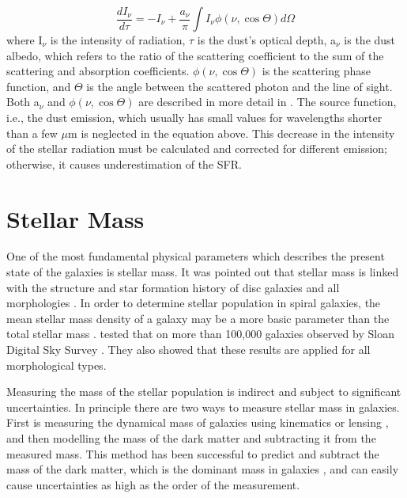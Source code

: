 \begin{equation}
\frac{dI_{\nu}}{d\tau} = -I_{\nu}  + \frac{a_{\nu}}{\pi} \int I_{\nu}\phi(\nu,\cos \Theta)d\Omega
\end{equation}
where I$_{\nu}$ is the intensity of radiation, $\tau$ is the dust's optical depth, a$_{\nu}$ is the dust albedo, which refers to the ratio of the scattering coefficient to the sum of the scattering and absorption coefficients. $\phi(\nu,\cos \Theta)$ is the scattering phase function, and $\Theta$ is the angle between the scattered photon and the line of sight. Both a$_{\nu}$ and $\phi(\nu,\cos \Theta)$ are described in more detail in \citep{Draine03}. The source function, i.e., the dust emission, which usually has small values for wavelengths shorter than a few $\mu$m is neglected in the equation above. This decrease in the intensity of the stellar radiation must be calculated and corrected for different emission; otherwise, it causes underestimation of the SFR. 


\section{Stellar Mass}
\label{starmass}
One of the most fundamental physical parameters which describes the present state of the galaxies is stellar mass. It was pointed out that stellar mass is linked with the structure and star formation history of disc galaxies \citep{Gavvazi96} and all morphologies \citep{Scodeggio02}. In order to determine stellar population in spiral galaxies, the mean stellar mass density of a galaxy may be a more basic parameter than the total stellar mass \citep{Bell00}. \cite{Kauffmann03} tested that on more than 100,000 galaxies observed by Sloan Digital Sky Survey \citep[SDSS;][]{York00}. They also showed that these results are applied for all morphological types.

Measuring the mass of the stellar population is indirect and subject to significant uncertainties. In principle there are two ways to measure stellar mass in galaxies. First is measuring the dynamical mass of galaxies using kinematics \citep{Cappellari06} or lensing \citep{Auger09}, and then modelling the mass of the dark matter and subtracting it from the measured mass. This method has been successful to predict and subtract the mass of the dark matter, which is the dominant mass in galaxies \citep{Zaritsky94},  and can easily cause uncertainties as high as the order of the measurement. 

